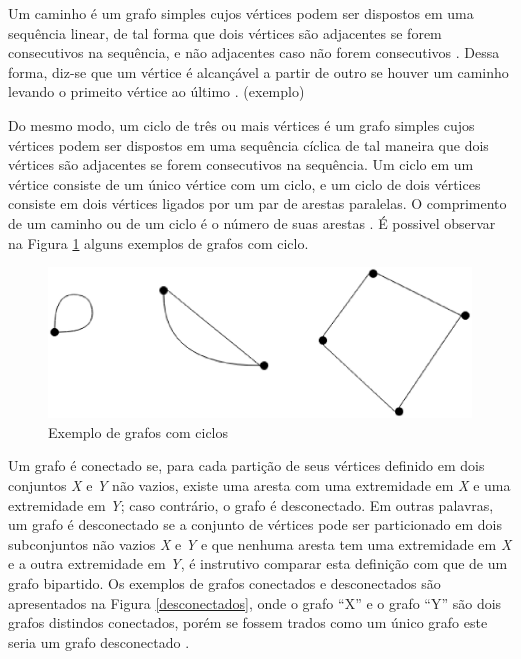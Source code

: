 Um caminho é um grafo simples cujos vértices podem ser dispostos em uma sequência linear, de tal forma que dois vértices são adjacentes se forem consecutivos na sequência, e não adjacentes caso não forem consecutivos \cite{Bondy:2007}. Dessa forma, diz-se que um vértice é alcançável a partir de outro se houver um caminho levando o primeito vértice ao último \cite{Costa:2011}.
(exemplo)

Do mesmo modo, um ciclo de três ou mais vértices é um grafo simples cujos vértices podem ser dispostos em uma sequência cíclica de tal maneira que dois vértices são adjacentes se forem consecutivos na sequência. Um ciclo em um vértice consiste de um único vértice com um ciclo, e um ciclo de dois vértices consiste em dois vértices ligados por um par de arestas paralelas. O comprimento de um caminho ou de um ciclo é o número de suas arestas \cite{Costa:2011}. É possivel observar na Figura \ref{ciclos} alguns exemplos de grafos com ciclo.

\begin{figure}[!h]
	\centering
	\includegraphics[scale=0.5]{figuras/capitulo1/ciclos.eps}
	\caption{Exemplo de grafos com ciclos}
	\label{ciclos}
\end{figure}

Um grafo é conectado se, para cada partição de seus vértices definido em dois conjuntos \textit{X} e \textit{Y} não vazios, existe uma aresta com uma extremidade em \textit{X} e uma extremidade em \textit{Y}; caso contrário, o grafo é desconectado. Em outras palavras, um grafo é desconectado se a conjunto de vértices pode ser particionado em dois subconjuntos não vazios \textit{X} e \textit{Y} e que nenhuma aresta tem uma extremidade em \textit{X} e a outra extremidade em \textit{Y}, é instrutivo comparar esta definição com que de um grafo bipartido. Os exemplos de grafos conectados e desconectados são apresentados na Figura \ref{desconectados}, onde o grafo ``X'' e o grafo ``Y'' são dois grafos distindos conectados, porém se fossem trados como um único grafo este seria um grafo desconectado \cite{Bondy:2007}.


